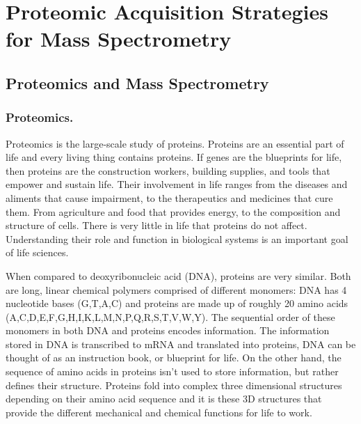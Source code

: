 \chapter{Proteomic Acquisition Strategies for Mass Spectrometry}

\section{Proteomics and Mass Spectrometry}

\subsection{Proteomics.}
Proteomics is the large-scale study of proteins. Proteins are an essential part of life and every living thing contains proteins. If genes are the blueprints for life, then proteins are the construction workers, building supplies, and tools that empower and sustain life. Their involvement in life ranges from the diseases and aliments that cause impairment, to the therapeutics and medicines that cure them. From agriculture and food that provides energy, to the composition and structure of cells. There is very little in life that proteins do not affect. Understanding their role and function in biological systems is an important goal of life sciences. 

When compared to deoxyribonucleic acid (DNA), proteins are very similar. Both are long, linear chemical polymers comprised of different monomers: DNA has 4 nucleotide bases (G,T,A,C) and proteins are made up of roughly 20 amino acids (A,C,D,E,F,G,H,I,K,L,M,N,P,Q,R,S,T,V,W,Y). The sequential order of these monomers in both DNA and proteins encodes information. The information stored in DNA is transcribed to mRNA and translated into proteins, DNA can be thought of as an instruction book, or blueprint for life. On the other hand, the sequence of amino acids in proteins isn't used to store information, but rather defines their structure. Proteins fold into complex three dimensional structures depending on their amino acid sequence and it is these 3D structures that provide the different mechanical and chemical functions for life to work.

